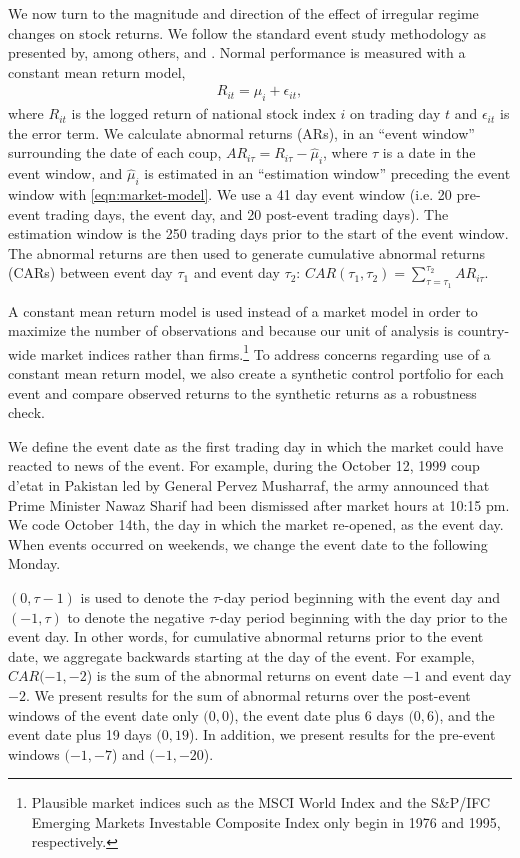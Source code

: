 \documentclass[12pt,final,fleqn]{article}
\theoremstyle{plain}
\begin{document}
We now turn to the magnitude and direction of the effect of irregular regime changes on stock returns. We follow the standard event study methodology as presented by, among others, \citet{mackinlay1997event} and \citet{campbell1997econometrics}. Normal performance is measured with a constant mean return model,
\begin{align} \label{eqn:market-model}
R_{it}=\mu_{i}+\epsilon_{it},
\end{align}
where $R_{it}$ is the logged return of national stock index $i$ on trading day $t$ and $\epsilon_{it}$ is the error term. We calculate abnormal returns (ARs), in an ``event window'' surrounding the date of each coup, $AR_{i\tau}=R_{i\tau}-\widehat{\mu}_i$, where $\tau$ is a date in the event window, and $\widehat{\mu}_i$ is estimated in an ``estimation window'' preceding the event window with \autoref{eqn:market-model}. We use a 41 day event window (i.e. 20 pre-event trading days, the event day, and 20 post-event trading days). The estimation window is the 250 trading days prior to the start of the event window. The abnormal returns are then used to generate cumulative abnormal returns (CARs) between event day $\tau_1$ and event day $\tau_2$: $CAR(\tau_1,\tau_2)=\sum_{\tau=\tau_1}^{\tau_2}AR_{i\tau}$.

A constant mean return model is used instead of a market model in order to maximize the number of observations and because our unit of analysis is country-wide market indices rather than firms.\footnote{Plausible market indices such as the MSCI World Index and the S\&P/IFC Emerging Markets Investable Composite Index only begin in 1976 and 1995, respectively.} To address concerns regarding use of a constant mean return model, we also create a synthetic control portfolio for each event and compare observed returns to the synthetic returns as a robustness check. 

We define the event date as the first trading day in which the market could have reacted to news of the event. For example, during the October 12, 1999 coup d'etat in Pakistan led by General Pervez Musharraf, the army announced that Prime Minister Nawaz Sharif had been dismissed after market hours at 10:15 pm. We code October 14th, the day in which the market re-opened, as the event day. When events occurred on weekends, we change the event date to the following Monday.

$(0,\tau-1)$ is used to denote the $\tau$-day period beginning with the event day and $(-1,\tau)$ to denote the negative $\tau$-day period beginning with the day prior to the event day. In other words, for cumulative abnormal returns prior to the event date, we aggregate backwards starting at the day of the event. For example, $CAR(-1,-2$) is the sum of the abnormal returns on event date $-1$ and event day $-2$. We present results for the sum of abnormal returns over the post-event windows of the event date only $(0,0$), the event date plus 6 days $(0,6$), and the event date plus 19 days $(0,19$). In addition, we present results for the pre-event windows $(-1,-7$) and $(-1,-20$).
\end{document}
